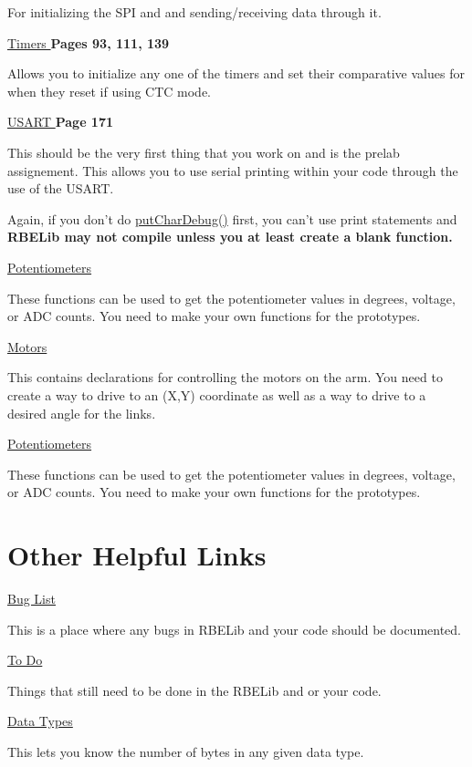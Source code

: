 For initializing the S\-P\-I and and sending/receiving data through it. 

 \hyperlink{timer_8h}{Timers } {\bfseries  Pages 93, 111, 139 }

Allows you to initialize any one of the timers and set their comparative values for when they reset if using C\-T\-C mode. 

 \hyperlink{_u_s_a_r_t_debug_8h}{U\-S\-A\-R\-T } {\bfseries  Page 171 }

This should be the very first thing that you work on and is the prelab assignement. This allows you to use serial printing within your code through the use of the U\-S\-A\-R\-T.

Again, if you don't do \hyperlink{_u_s_a_r_t_debug_8h_ab52220b9802762326175f5a6d09c50a1}{put\-Char\-Debug()} first, you can't use print statements and {\bfseries R\-B\-E\-Lib may not compile unless you at least create a blank function.} 

 \hyperlink{pot_8h}{Potentiometers }

These functions can be used to get the potentiometer values in degrees, voltage, or A\-D\-C counts. You need to make your own functions for the prototypes. 

 \hyperlink{motors_8h}{Motors }

This contains declarations for controlling the motors on the arm. You need to create a way to drive to an (X,Y) coordinate as well as a way to drive to a desired angle for the links. 

 \hyperlink{pot_8h}{Potentiometers }

These functions can be used to get the potentiometer values in degrees, voltage, or A\-D\-C counts. You need to make your own functions for the prototypes. \hypertarget{index_helpful}{}\section{Other Helpful Links}\label{index_helpful}
\par
 \hyperlink{bug}{Bug List }

This is a place where any bugs in R\-B\-E\-Lib and your code should be documented. 

 \hyperlink{todo}{To Do }

Things that still need to be done in the R\-B\-E\-Lib and or your code. 

 \hyperlink{datatypes}{Data Types }

This lets you know the number of bytes in any given data type. 
